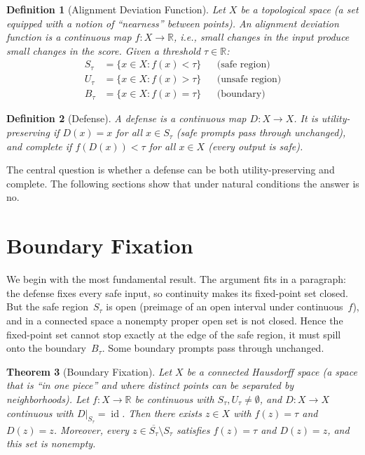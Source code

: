 \documentclass{article}
\newtheorem{theorem}{Theorem}[section]
\newtheorem{definition}[theorem]{Definition}
\newcommand{\R}{\mathbb{R}}
\newcommand{\cl}[1]{\overline{#1}}
\newcommand{\id}{\operatorname{id}}
\begin{document}
\begin{definition}[Alignment Deviation Function]
\label{def:ad}
Let $X$ be a topological space (a set equipped with a notion of
``nearness'' between points). An \emph{alignment deviation function} is
a continuous map $f\colon X \to \R$, i.e., small changes in the
input produce small changes in the score. Given a threshold
$\tau\in\R$:
\begin{align}
  S_\tau &= \{x \in X : f(x) < \tau\}  &&\text{(safe region)} \\
  U_\tau &= \{x \in X : f(x) > \tau\}  &&\text{(unsafe region)} \\
  B_\tau &= \{x \in X : f(x) = \tau\}  &&\text{(boundary)}
\end{align}
\end{definition}

\begin{definition}[Defense]
\label{def:defense}
A \emph{defense} is a continuous map $D\colon X \to X$. It is
\emph{utility-preserving} if $D(x) = x$ for all $x \in S_\tau$
(safe prompts pass through unchanged),
and \emph{complete} if $f(D(x)) < \tau$ for all $x\in X$
(every output is safe).
\end{definition}

The central question is whether a defense can be both
utility-preserving and complete. The following sections show that under
natural conditions the answer is no.


\section{Boundary Fixation}
\label{sec:boundary}

We begin with the most fundamental result. The argument fits in a
paragraph: the defense fixes every safe input, so continuity makes its
fixed-point set closed. But the safe region~$S_\tau$ is open (preimage
of an open interval under continuous~$f$), and in a connected space a
nonempty proper open set is not closed. Hence the fixed-point set
cannot stop exactly at the edge of the safe region, it must spill onto
the boundary~$B_\tau$. Some boundary prompts pass through unchanged.

\begin{theorem}[Boundary Fixation]
\label{thm:main}
Let $X$ be a connected Hausdorff space (a space that is ``in one
piece'' and where distinct points can be separated by neighborhoods).
Let $f\colon X\to\R$ be continuous with $S_\tau, U_\tau \neq
\emptyset$, and $D\colon X \to X$ continuous with
$D|_{S_\tau} = \id$. Then there exists $z\in X$ with $f(z) = \tau$
and $D(z) = z$. Moreover, every $z \in \cl{S_\tau} \setminus S_\tau$
satisfies $f(z) = \tau$ and $D(z) = z$, and this set is nonempty.
\end{theorem}
\end{document}
